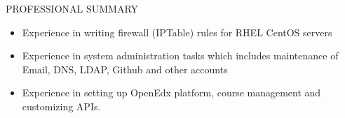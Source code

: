 \documentclass{resume} %
\begin{document}
\begin{rSection}{PROFESSIONAL SUMMARY}
\begin{itemize}
  \item Experience in writing firewall (IPTable) rules for
    RHEL CentOS servers
  \item Experience in system administration tasks which
    includes maintenance of Email, DNS, LDAP, Github and
    other accounts
    
  \item Experience in setting up OpenEdx platform, course
    management and customizing APIs.

  \end{itemize}

\end{rSection}

\end{document}
